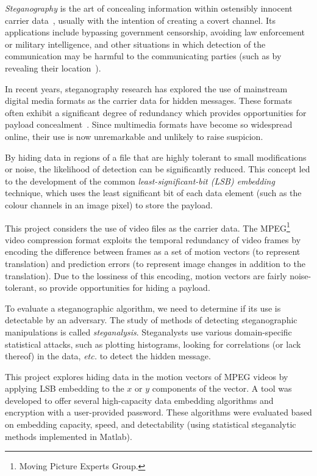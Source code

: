 \documentclass[12pt,british,twoside,notitlepage,usenames,dvipsnames,hypens,final]{report}
\numberwithin{equation}{section}
\numberwithin{figure}{section}
\begin{document}
\emph{Steganography} is the art of concealing information within ostensibly innocent carrier data~\cite[p.~3]{fridrich}, usually with the intention of creating a covert channel. Its applications include bypassing government censorship, avoiding law enforcement or military intelligence, and other situations in which detection of the communication may be harmful to the communicating parties (such as by revealing their location~\cite{infohiding-survey}). 

In recent years, steganography research has explored the use of mainstream digital media formats as the carrier data for hidden messages. These formats often exhibit a significant degree of redundancy which provides opportunities for payload concealment~\cite[p.~2]{fridrich}. Since multimedia formats have become so widespread online, their use is now unremarkable and unlikely to raise suspicion.

By hiding data in regions of a file that are highly tolerant to small modifications or noise, the likelihood of detection can be significantly reduced. This concept led to the development of the common \emph{least-significant-bit (LSB) embedding}~\cite{bateman}\label{lsb-steg} technique, which uses the least significant bit of each data element (such as the colour channels in an image pixel) to store the payload.

This project considers the use of video files as the carrier data. The MPEG\footnote{Moving Picture Experts Group.} video compression format exploits the temporal redundancy of video frames by encoding the difference between frames as a set of motion vectors (to represent translation) and prediction errors (to represent image changes in addition to the translation). Due to the lossiness of this encoding, motion vectors are fairly noise-tolerant, so provide opportunities for hiding a payload.

To evaluate a steganographic algorithm, we need to determine if its use is detectable by an adversary. The study of methods of detecting steganographic manipulations is called \emph{steganalysis}. Steganalysts use various domain-specific statistical attacks, such as plotting histograms, looking for correlations (or lack thereof) in the data, \emph{etc.} to detect the hidden message.

This project explores hiding data in the motion vectors of MPEG videos by applying LSB embedding to the $x$ or $y$ components of the vector. A tool was developed to offer several high-capacity data embedding algorithms and encryption with a user-provided password. These algorithms were evaluated based on embedding capacity, speed, and detectability (using statistical steganalytic methods implemented in Matlab).
\end{document}
